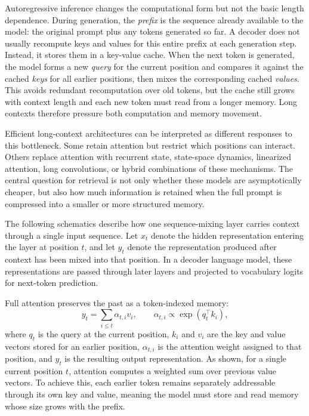 \documentclass[10pt]{article}
\begin{document}
Autoregressive inference changes the computational form but not the basic
length dependence. During generation, the \textit{prefix} is the sequence already
available to the model: the original prompt plus any tokens generated so far.
A decoder does not usually recompute keys and values for this entire prefix at
each generation step. Instead, it stores them in a key-value cache. When the
next token is generated, the model forms a new \textit{query} for the current position
and compares it against the cached \textit{keys} for all earlier positions, then mixes
the corresponding cached \textit{values}. This avoids redundant recomputation over old
tokens, but the cache still grows with context length and each new token must
read from a longer memory. Long contexts therefore pressure both computation
and memory movement.

Efficient long-context architectures can be interpreted as different responses
to this bottleneck. Some retain attention but restrict which positions can
interact. Others replace attention with recurrent state, state-space dynamics,
linearized attention, long convolutions, or hybrid combinations of these
mechanisms. The central question for retrieval is not only whether these models
are asymptotically cheaper, but also how much information is retained when the full
prompt is compressed into a smaller or more structured memory.

The following schematics describe how one sequence-mixing layer carries context
through a single input sequence. Let \(x_t\) denote the hidden representation
entering the layer at position \(t\), and let \(y_t\) denote the representation
produced after context has been mixed into that position. In a decoder language
model, these representations are passed through later layers and projected to
vocabulary logits for next-token prediction.

Full attention preserves the past as a token-indexed memory:
\[
y_t=\sum_{i\leq t}\alpha_{t,i}v_i,\qquad
\alpha_{t,i}\propto \exp(q_t^\top k_i),
\]
where \(q_t\) is the query at the current position, \(k_i\) and \(v_i\) are the
key and value vectors stored for an earlier position, \(\alpha_{t,i}\) is the
attention weight assigned to that position, and \(y_t\) is the resulting output
representation. As shown, for a single current position
\(t\), attention computes a weighted sum over previous value vectors. To achieve this, each
earlier token remains separately addressable through its own key and value, meaning
the model must store and read memory whose size grows with the prefix.
\end{document}
